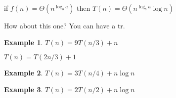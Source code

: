 \documentclass[a4paper, 10pt]{ctexart} %
\newtheorem{example}{Example}
\begin{document}
    if $f\left(n\right)  = \Theta \left( n ^{\log _{b} a    } \right)$ then $T\left(n\right) = \Theta \left( n ^{\log _{b} a } \log n\right)$

How about this one? You can have a tr. 
\begin{example}
    $T\left(n \right) =   9  T\left( n / 3\right) + n$

    $T\left( n\right) = T\left( 2n /3\right) + 1$
\end{example}

\begin{example}
    $T\left(n\right)  =  3 T\left( n / 4\right) + n \log n$
\end{example}
\begin{example}
    $T\left(n\right) =      2  T \left( n /2\right) +  n\log n  $
\end{example}
\end{document}
